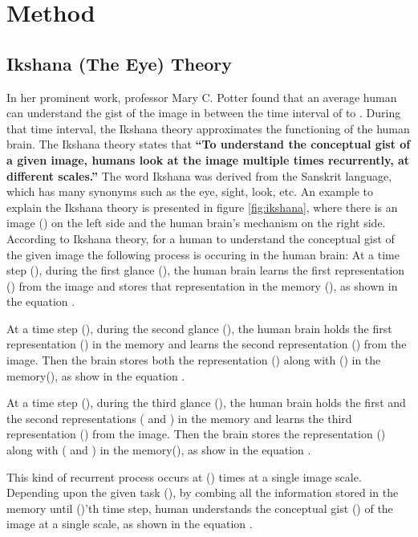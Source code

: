 \documentclass{article}
\begin{document}
\section{Method}
\subsection{Ikshana (The Eye) Theory}
In her prominent work\cite{potter1975meaning}, professor Mary C. Potter found that an average human can understand the gist of the image in between the time interval of  to . During that time interval, the Ikshana theory approximates the functioning of the human brain.\newline
The Ikshana theory states that \textbf{``To  understand the conceptual gist of a given image, humans look at the image multiple times recurrently, at different scales.''} The word Ikshana was derived from the Sanskrit language, which has many synonyms such as the eye, sight, look, etc. \newline
An example to explain the Ikshana theory is presented in figure \ref{fig:ikshana}, where there is an image () on the left side and the human brain's mechanism on the right side.
According to Ikshana theory, for a human to understand the conceptual gist of the given image the following process is occuring in the human brain: \newline
At a time step (), during the first glance (),  the human brain learns the first representation () from the image and stores that representation in the memory (), as shown in the equation .

At a time step (), during the second glance (), the human brain holds the first representation () in the memory and learns the second representation () from the image. Then the brain stores both the representation () along with () in the memory(), as show in the equation .

At a time step (), during the third glance (), the human brain holds the first and the second representations ( and ) in the memory and learns the third representation () from the image. Then the brain stores the representation () along with ( and ) in the memory(), as show in the equation .  

This kind of recurrent process occurs at () times at a single image scale. Depending upon the given task (), by combing all the information stored in the memory until ()'th time step, human understands the conceptual gist () of the image at a single scale, as shown in the equation . 
\end{document}
